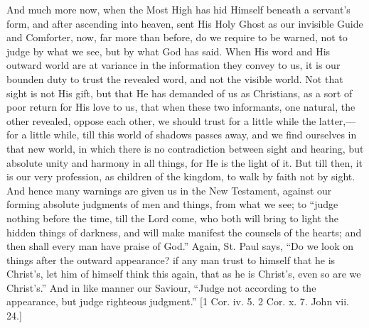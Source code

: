 And much more now, when the Most High has hid Himself beneath a
servant's form, and after ascending into heaven, sent His Holy Ghost
as our invisible Guide and Comforter, now, far more than before, do we
require to be warned, not to judge by what we see, but by what God has
said. When His word and His outward world are at variance in the
information they convey to us, it is our bounden duty to trust the
revealed word, and not the visible world. Not that sight is not His
gift, but that He has demanded of us as Christians, as a sort of poor
return for His love to us, that when these two informants, one
natural, the other revealed, oppose each other, we should trust for a
little while the latter,—for a little while, till this world of
shadows passes away, and we find ourselves in that new world, in which
there is no contradiction between sight and hearing, but absolute
unity and harmony in all things, for He is the light of it. But till
then, it is our very profession, as children of the kingdom, to walk
by faith not by sight. And hence many warnings are given us in the New
Testament, against our forming absolute judgments of men and things,
from what we see; to ``judge nothing before the time, till the
Lord come, who both will bring to light the hidden things of darkness,
and will make manifest the counsels of the hearts; and then shall
every man have praise of God.'' Again, St. Paul says, ``Do we
look on things after the outward appearance? if any man trust to
himself that he is Christ's, let him of himself think this again, that
as he is Christ's, even so are we Christ's.'' And in like manner
our Saviour, ``Judge not according to the appearance, but judge
righteous judgment.'' [1 Cor. iv. 5. 2 Cor. x. 7. John vii. 24.]

